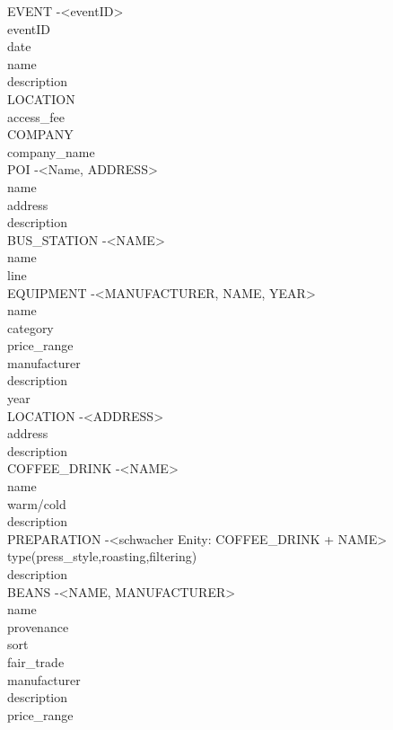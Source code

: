 EVENT -<eventID>\\
eventID\\
date\\
name\\
description\\
LOCATION\\
access\_fee\\

COMPANY\\
company\_name\\


POI -<Name, ADDRESS>\\
name\\
address\\
description\\

BUS\_STATION -<NAME>\\
name\\
line\\

EQUIPMENT -<MANUFACTURER, NAME, YEAR>\\
name\\
category\\
price\_range\\
manufacturer\\
description\\
year\\

LOCATION -<ADDRESS>\\
address\\
description\\

COFFEE\_DRINK -<NAME>\\
name\\
warm/cold\\
description\\



PREPARATION -<schwacher Enity: COFFEE\_DRINK + NAME>\\
type(press\_style,roasting,filtering)\\
description\\




BEANS -<NAME, MANUFACTURER>\\
name\\
provenance\\
sort\\
fair\_trade\\
manufacturer\\
description\\
price\_range\\

